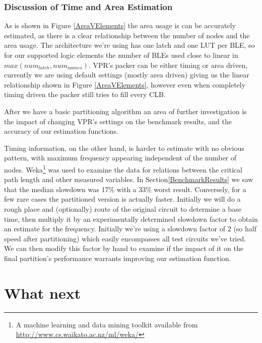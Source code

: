\documentclass[12pt,drafta4paper,oneside]{memoir} %
\begin{document}
\subsection{Discussion of Time and Area Estimation}
As is shown in Figure \ref{AreaVElements} the area usage is can be accurately estimated, as there is a clear relationship between the number of nodes and the area usage. The architecture we're using has one latch and one \ac{LUT} per \ac{BLE}, so for our supported logic elements the number of \acp{BLE} used close to linear in $max(num_{latch}, num_{names})$. \ac{VPR}'s packer can be either timing or area driven, currently we are using default settings (mostly area driven) giving us the linear relationship shown in Figure \ref{AreaVElements}, however even when completely timing driven the packer still tries to fill every \ac{CLB}\cite{AAPackThesis}.

After we have a basic partitioning algorithm an area of further investigation is the impact of changing \ac{VPR}'s settings on the benchmark results, and the accuracy of our estimation functions.

Timing information, on the other hand, is harder to estimate with no obvious pattern, with maximum frequency appearing independent of the number of nodes. Weka\footnote{A machine learning and data mining toolkit available from \url{http://www.cs.waikato.ac.nz/ml/weka/}} was used to examine the data for relations between the critical path length and other measured variables. In Section\ref{BenchmarkResults} we saw that the median slowdown was 17\% with a 33\% worst result. Conversely, for a few rare cases the partitioned version is actually faster. Initially we will do a rough place and (optionally) route of the original circuit to determine a base time, then multiply it by an experimentally determined slowdown factor to obtain an estimate for the frequency. Initially we're using a slowdown factor of 2 (so half speed after partitioning) which easily encompasses all test circuits we've tried. We can then modify this factor by hand to examine if the impact of it on the final partition's performance warrants improving our estimation function.

\chapter{What next}
\end{document}
